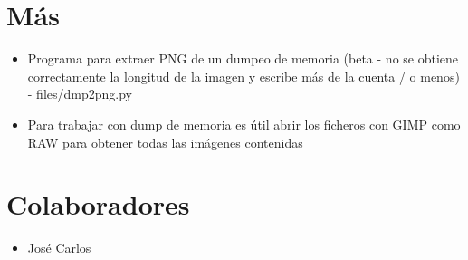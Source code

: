 \documentclass[11pt, spanish]{report}
\begin{document}
\section*{Más}
\begin{itemize}
	\item Programa para extraer PNG de un dumpeo de memoria (beta - no se obtiene correctamente la longitud de la imagen y escribe más de la cuenta / o menos) - files/dmp2png.py
	\item Para trabajar con dump de memoria es útil abrir los ficheros con GIMP como RAW para obtener todas las imágenes contenidas
\end{itemize}

\section*{Colaboradores}
\begin{itemize}
	\item José Carlos
\end{itemize}
\end{document}
